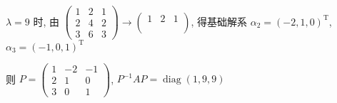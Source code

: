 \begin{enumerate}
                   \(\lambda=9\) 时, 由 \(\begin{pmatrix}
                       1 & 2 & 1 \\
                       2 & 4 & 2 \\
                       3 & 6 & 3
                   \end{pmatrix} \to
                   \begin{pmatrix}
                       1 & 2 & 1 \\
                         &   &   \\
                         &   &
                   \end{pmatrix} \), 得基础解系 \(\alpha_2=(-2,1,0)^{\mathrm{T}}\), \(\alpha_3=(-1,0,1)^{\mathrm{T}}\)

                   则 \(P=
                   \begin{pmatrix}
                       1 & -2 & -1 \\
                       2 & 1  & 0  \\
                       3 & 0  & 1
                   \end{pmatrix} \), \(P^{-1}AP=\operatorname{diag}(1,9,9)\)
         \end{enumerate}

